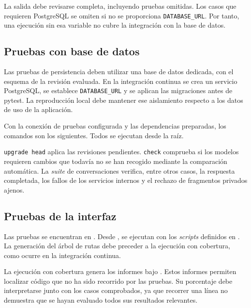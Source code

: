 
La salida debe revisarse completa, incluyendo pruebas omitidas. Los casos que requieren PostgreSQL se omiten si no se proporciona \texttt{DATABASE\_URL}. Por tanto, una ejecución sin esa variable no cubre la integración con la base de datos.

\subsection{Pruebas con base de datos}
\label{sec:d-pruebas-datos}

Las pruebas de persistencia deben utilizar una base de datos dedicada, con el esquema de la revisión evaluada. En la integración continua se crea un servicio PostgreSQL, se establece \texttt{DATABASE\_URL} y se aplican las migraciones antes de pytest. La reproducción local debe mantener ese aislamiento respecto a los datos de uso de la aplicación.

Con la conexión de pruebas configurada y las dependencias preparadas, los comandos son los siguientes. Todos se ejecutan desde la raíz.


\texttt{upgrade head} aplica las revisiones pendientes. \texttt{check} comprueba si los modelos requieren cambios que todavía no se han recogido mediante la comparación automática. La \textit{suite} de conversaciones verifica, entre otros casos, la respuesta completada, los fallos de los servicios internos y el rechazo de fragmentos privados ajenos.

\subsection{Pruebas de la interfaz}

Las pruebas se encuentran en . Desde , se ejecutan con los \textit{scripts} definidos en . La generación del árbol de rutas debe preceder a la ejecución con cobertura, como ocurre en la integración continua.


La ejecución con cobertura genera los informes bajo . Estos informes permiten localizar código que no ha sido recorrido por las pruebas. Su porcentaje debe interpretarse junto con los casos comprobados, ya que recorrer una línea no demuestra que se hayan evaluado todos sus resultados relevantes.

